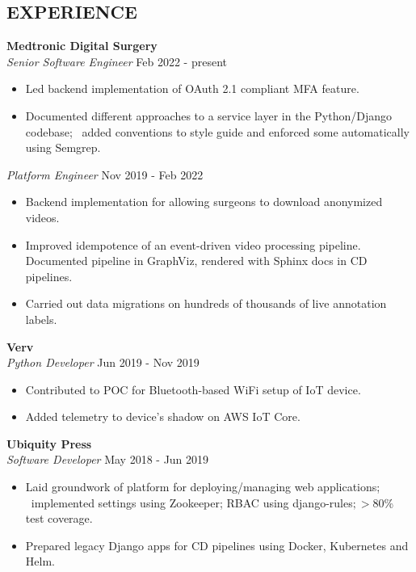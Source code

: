 \documentclass[line,margin]{res}
\begin{document}
\begin{resume}
\section{EXPERIENCE} \textbf{Medtronic Digital Surgery} \\
                {\sl Senior Software Engineer} \hfill   Feb 2022 - present \\
                 \begin{itemize}  \itemsep -2pt %
                   \item Led backend implementation of OAuth 2.1 compliant MFA feature.
                   \item Documented different approaches to a service layer in the Python/Django codebase; \
                         added conventions to style guide and enforced some automatically using Semgrep. 
                 \end{itemize}
                {\sl Platform Engineer} \hfill          Nov 2019 - Feb 2022 \\
                  \begin{itemize}  \itemsep -2pt %
                  \item Backend implementation for allowing surgeons to download anonymized videos.
                  \item Improved idempotence of an event-driven video processing pipeline. \\
                        Documented pipeline in GraphViz, rendered with Sphinx docs in CD pipelines.
                  \item Carried out data migrations on hundreds of thousands of live annotation labels.
                  \end{itemize} 

                \textbf{Verv} \\
                {\sl Python Developer} \hfill        Jun 2019 - Nov 2019 \\
                  \begin{itemize} \itemsep -2pt %
                  \item Contributed to POC for Bluetooth-based WiFi setup of IoT device.\ 
                  \item Added telemetry to device's shadow on AWS IoT Core. 
                  \end{itemize} 

                \textbf{Ubiquity Press} \\
                {\sl Software Developer} \hfill        May 2018 - Jun 2019 \\
                  \begin{itemize} \itemsep -2pt %
                  \item Laid groundwork of platform for deploying/managing web applications; \
                        implemented settings using Zookeeper; RBAC using django-rules$; > $80\% test coverage.
                  \item Prepared legacy Django apps for CD pipelines using Docker, Kubernetes and Helm. 
                  \end{itemize}
                

\end{resume}
\end{document}
